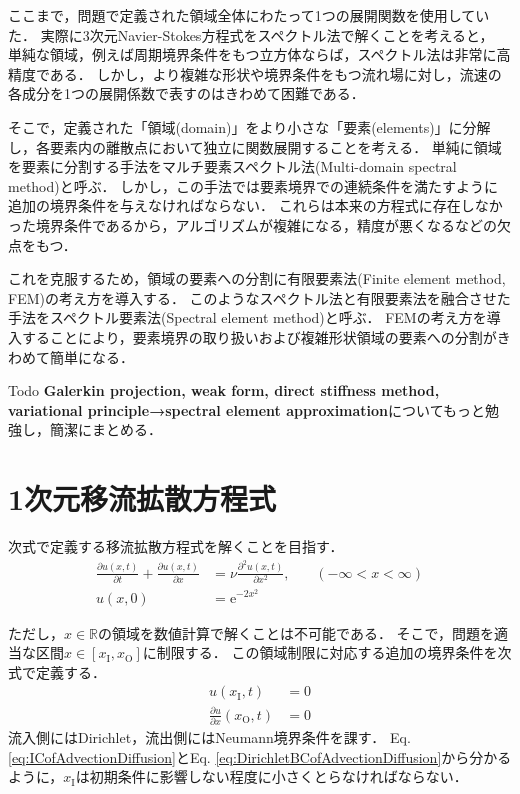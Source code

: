 \documentclass[12pt,a4paper]{jsarticle}
\begin{document}
ここまで，問題で定義された領域全体にわたって1つの展開関数を使用していた．
実際に3次元Navier-Stokes方程式をスペクトル法で解くことを考えると，
単純な領域，例えば周期境界条件をもつ立方体ならば，スペクトル法は非常に高精度である．
しかし，より複雑な形状や境界条件をもつ流れ場に対し，流速の各成分を1つの展開係数で表すのはきわめて困難である．

そこで，定義された「領域(domain)」をより小さな「要素(elements)」に分解し，各要素内の離散点において独立に関数展開することを考える．
単純に領域を要素に分割する手法をマルチ要素スペクトル法(Multi-domain spectral method)と呼ぶ．
しかし，この手法では要素境界での連続条件を満たすように追加の境界条件を与えなければならない．
これらは本来の方程式に存在しなかった境界条件であるから，アルゴリズムが複雑になる，精度が悪くなるなどの欠点をもつ．

これを克服するため，領域の要素への分割に有限要素法(Finite element method, FEM)の考え方を導入する．
このようなスペクトル法と有限要素法を融合させた手法をスペクトル要素法(Spectral element method)と呼ぶ．
FEMの考え方を導入することにより，要素境界の取り扱いおよび複雑形状領域の要素への分割がきわめて簡単になる．\\

\begin{itembox}[l]{Todo}
  \textbf{Galerkin projection, weak form, direct stiffness method, variational principle→spectral element approximation}についてもっと勉強し，簡潔にまとめる．
\end{itembox}


\clearpage
\section{1次元移流拡散方程式}
\label{sec:Advection_Diffusion}
次式で定義する移流拡散方程式を解くことを目指す．
\begin{align}
  \frac{\partial u(x,t)}{\partial t} + \frac{\partial u(x,t)}{\partial x} &= \nu \frac{\partial^2 u(x,t)}{\partial x^2}, ~~~~~~~~(-\infty < x < \infty)
  \label{eq:DefofAdvectionDiffusion} \\
  u(x,0) &= \mathrm{e}^{-2x^2}
  \label{eq:ICofAdvectionDiffusion}
\end{align}

ただし，$x \in \mathbb{R}$の領域を数値計算で解くことは不可能である．
そこで，問題を適当な区間$x \in [x_{\text{I}}, x_{\text{O}}]$に制限する．
この領域制限に対応する追加の境界条件を次式で定義する．
\begin{align}
  u(x_{\text{I}},t) &= 0
  \label{eq:DirichletBCofAdvectionDiffusion} \\
  \frac{\partial u}{\partial x}(x_{\text{O}},t) &= 0
  \label{eq:NeumannBCofAdvectionDiffusion}
\end{align}
流入側にはDirichlet，流出側にはNeumann境界条件を課す．
Eq. \ref{eq:ICofAdvectionDiffusion}とEq. \ref{eq:DirichletBCofAdvectionDiffusion}から分かるように，$x_{\text{I}}$は初期条件に影響しない程度に小さくとらなければならない．\\
\end{document}
